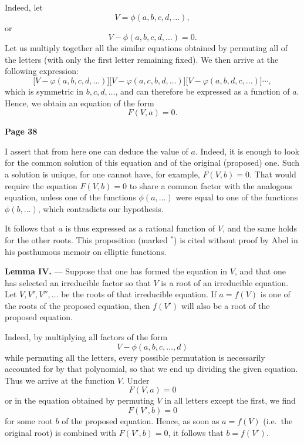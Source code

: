 \documentclass{article}
\begin{document}
\smallskip

Indeed, let
\[
V = \phi(a, b, c, d, \dots),
\]
or
\[
V - \phi(a, b, c, d, \dots) = 0.
\]
Let us multiply together all the similar equations obtained by permuting 
all of the letters (with only the first letter remaining fixed). We then arrive 
at the following expression:
\[
\bigl[V - \varphi(a, b, c, d,\dots)\bigr]
\bigl[V - \varphi(a, c, b, d,\dots)\bigr]
\bigl[V - \varphi(a, b, d, c,\dots)\bigr]
\cdots,
\]
which is symmetric in $b, c, d,\dots$, and can therefore be expressed 
as a function of $a$. Hence, we obtain an equation of the form
\[
F(V, a) = 0.
\]

\newpage


\centerline{\textbf{Page 38}}

\medskip

\noindent
I assert that from here one can deduce the value of \(a\). Indeed, it is enough to look for the common solution of this equation and of the original (proposed) one. Such a solution is unique, for one cannot have, for example, \(F(V, b) = 0\). That would require the equation \(F(V, b) = 0\) to share a common factor with the analogous equation, unless one of the functions \(\phi(a, \dots)\) were equal to one of the functions \(\phi(b, \dots)\), which contradicts our hypothesis.

\smallskip

\noindent
It follows that \(a\) is thus expressed as a rational function of \(V\), and the same holds for the other roots. This proposition (marked \(^*\)) is cited without proof by Abel in his posthumous memoir on elliptic functions.

\medskip

\noindent
\textbf{Lemma IV.} --- Suppose that one has formed the equation in \(V\), and that one has selected an irreducible factor so that \(V\) is a root of an irreducible equation. Let \(V, V', V'', \dots\) be the roots of that irreducible equation. If \(a = f(V)\) is one of the roots of the proposed equation, then \(f(V')\) will also be a root of the proposed equation.

\smallskip

\noindent
Indeed, by multiplying all factors of the form
\[
V - \phi(a, b, c, \dots, d)
\]
while permuting all the letters, every possible permutation is necessarily accounted for by that polynomial, so that we end up dividing the given equation. Thus we arrive at the function \(V\). Under
\[
F(V, a) = 0
\]
or in the equation obtained by permuting \(V\) in all letters except the first, we find
\[
F(V', b) = 0
\]
for some root \(b\) of the proposed equation. Hence, as soon as \(a = f(V)\) (i.e.\ the original root) is combined with \(F(V', b) = 0\), it follows that \(b = f(V')\).
\end{document}
